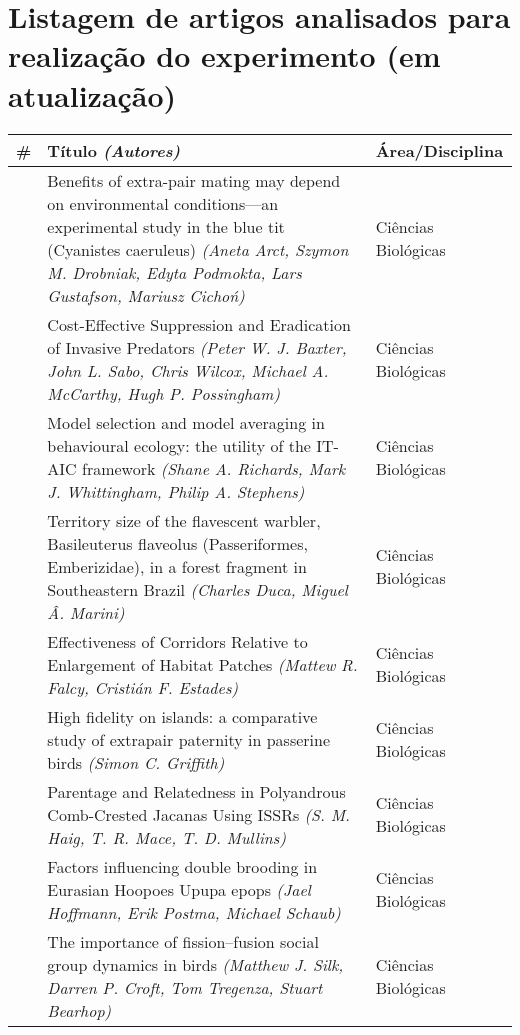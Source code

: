 
\chapter{Listagem de artigos analisados para realização do experimento (em atualização)}
\label{appendix:papers}

\begin{flushleft}
	\begin{longtable}{|C{0.6cm}|m{10.1cm}|C{4cm}|}
		\hline
	    \# & \textbf{Título \textit{(Autores)}} & \textbf{Área/Disciplina} \\ 
	    \hline
	    \rownumber & Benefits of extra-pair mating may depend on environmental conditions—an experimental study in the blue tit
(Cyanistes caeruleus) \textit{(Aneta Arct, Szymon M. Drobniak, Edyta Podmokta, Lars Gustafson, Mariusz Cichoń)} & Ciências Biológicas \\
		\hline
		\rownumber & Cost-Effective Suppression and Eradication of Invasive Predators \textit{(Peter W. J. Baxter, John L. Sabo, Chris Wilcox, Michael A. McCarthy, Hugh P. Possingham)} & Ciências Biológicas \\
		\hline
		\rownumber & Model selection and model averaging in behavioural ecology: the utility of the IT-AIC framework \textit{(Shane A. Richards, Mark J. Whittingham, Philip A. Stephens)} & Ciências Biológicas \\
		\hline
		\rownumber & Territory size of the flavescent warbler, Basileuterus flaveolus (Passeriformes, Emberizidae), in a forest fragment in Southeastern Brazil \textit{(Charles Duca, Miguel Â. Marini)} & Ciências Biológicas \\
		\hline
		\rownumber & Effectiveness of Corridors Relative to Enlargement of Habitat Patches \textit{(Mattew R. Falcy, Cristián F. Estades)} & Ciências Biológicas \\
		\hline
		\rownumber & High fidelity on islands: a comparative study of extrapair paternity in passerine birds \textit{(Simon C. Griffith)} & Ciências Biológicas \\
		\hline
		\rownumber & Parentage and Relatedness in Polyandrous Comb-Crested Jacanas Using ISSRs \textit{(S. M. Haig, T. R. Mace, T. D. Mullins)} & Ciências Biológicas \\
		\hline
		\rownumber & Factors influencing double brooding in Eurasian Hoopoes Upupa epops \textit{(Jael Hoffmann, Erik Postma, Michael Schaub)} & Ciências Biológicas \\
		\hline
		\rownumber & The importance of fission–fusion social group dynamics in birds \textit{(Matthew J. Silk, Darren P. Croft, Tom Tregenza, Stuart Bearhop)} & Ciências Biológicas \\

\end{longtable}
\end{flushleft}
